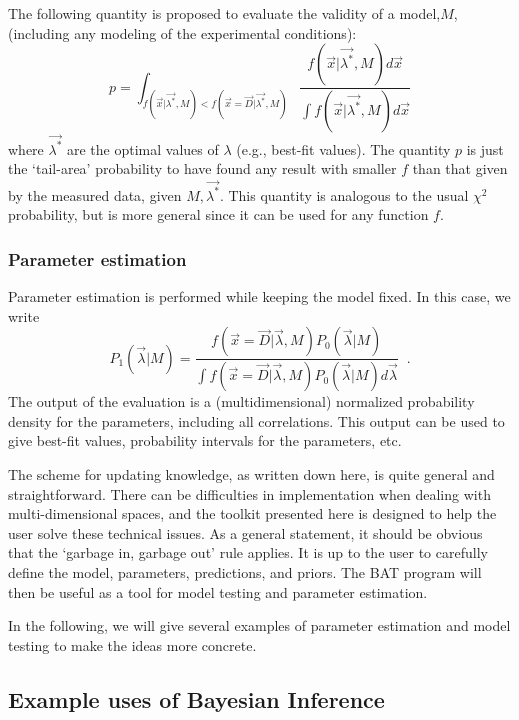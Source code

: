 \documentclass[11pt, a4paper]{article}
\begin{document}
The following quantity is proposed to evaluate the validity of a
model,$M$, (including any modeling of the experimental conditions):
%
\begin{equation}
p=\int_{f(\vec{x}|\vec{\lambda^*},M)<f(\vec{x}=\vec{D}|\vec{\lambda^*},M)} \frac{f(\vec{x}|\vec{\lambda^*},M) d\vec{x}}{\int f(\vec{x}|\vec{\lambda^*},M) d\vec{x}}
\end{equation}
%
where $\vec{\lambda^*}$ are the optimal values of $\lambda$ (e.g.,
best-fit values). The quantity $p$ is just the `tail-area' probability
to have found any result with smaller $f$ than that given by the
measured data, given $M,\vec{\lambda^*}$.  This quantity is analogous
to the usual $\chi^2$ probability, but is more general since it can be
used for any function $f$.

\subsubsection{Parameter estimation}
%
Parameter estimation is performed while keeping the model fixed.  In
this case, we write
%
\begin{equation}
P_{1}(\vec{\lambda}|M) =\frac{f(\vec{x}=\vec{D}|\vec{\lambda},M) P_{0}(\vec{\lambda}|M)}
{\int f(\vec{x}=\vec{D}|\vec{\lambda},M) P_{0}(\vec{\lambda}|M) d\vec{\lambda}} \;\; .
\label{eqn:BayesTheorem}
\end{equation}
%
The output of the evaluation is a (multidimensional) normalized
probability density for the parameters, including all correlations.
This output can be used to give best-fit values, probability intervals
for the parameters, etc.

The scheme for updating knowledge, as written down here, is quite
general and straightforward.  There can be difficulties in
implementation when dealing with multi-dimensional spaces, and the
toolkit presented here is designed to help the user solve these
technical issues.  As a general statement, it should be obvious that
the `garbage in, garbage out' rule applies.  It is up to the user to
carefully define the model, parameters, predictions, and priors.  The
BAT program will then be useful as a tool for model testing and
parameter estimation.

In the following, we will give several examples of parameter
estimation and model testing to make the ideas more concrete.


\subsection{Example uses of Bayesian Inference} 
\label{subsection:exampleuses} 
\end{document}
